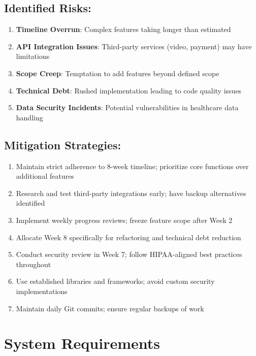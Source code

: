 \documentclass[11pt,a4paper]{article}
\begin{document}
\subsection*{Identified Risks:}
\begin{enumerate}[leftmargin=*, itemsep=0.1em]
    \item \textbf{Timeline Overrun}: Complex features taking longer than estimated
    \item \textbf{API Integration Issues}: Third-party services (video, payment) may have limitations
    \item \textbf{Scope Creep}: Temptation to add features beyond defined scope
    \item \textbf{Technical Debt}: Rushed implementation leading to code quality issues
    \item \textbf{Data Security Incidents}: Potential vulnerabilities in healthcare data handling
\end{enumerate}

\subsection*{Mitigation Strategies:}
\begin{enumerate}[leftmargin=*, itemsep=0.1em]
    \item Maintain strict adherence to 8-week timeline; prioritize core functions over additional features
    \item Research and test third-party integrations early; have backup alternatives identified
    \item Implement weekly progress reviews; freeze feature scope after Week 2
    \item Allocate Week 8 specifically for refactoring and technical debt reduction
    \item Conduct security review in Week 7; follow HIPAA-aligned best practices throughout
    \item Use established libraries and frameworks; avoid custom security implementations
    \item Maintain daily Git commits; ensure regular backups of work
\end{enumerate}

\section{System Requirements}
\end{document}
